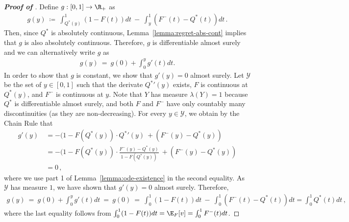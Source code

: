 \begin{proof}[\textbf{Proof of }]
    Define $g: [0, 1] \to \R_+$ as
	\begin{align*}
		g(y)\ \coloneqq\ \int_{Q^*(y)}^1 (1 - F(t)) dt\ -\ \int_y^1 (F^-(t) - Q^*(t)) dt\,.
	\end{align*}
	Then, since $Q^*$ is absolutely continuous, Lemma~\ref{lemma:regret-abs-cont} implies that $g$ is also absolutely continuous. Therefore, $g$ is differentiable almost surely and we can alternatively write $g$ as
	\begin{align*}
		g(y)\ =\ g(0) + \int_0^y g'(t)dt.
	\end{align*}
	In order to show that $g$ is constant, we show that $g'(y) = 0$ almost surely. Let $\mathcal{Y}$ be the set of $y \in [0,1]$ such that the derivate ${Q^*}'(y)$ exists, $F$ is continuous at $Q^*(y)$, and $F^-$ is continuous at $y$. Note that $Y$ has measure $\lambda(Y) = 1$ because $Q^*$ is differentiable almost surely, and both $F$ and $F^{-}$ have only countably many discontinuities (as they are non-decreasing). For every $y \in \mathcal{Y}$, we obtain by the Chain Rule that
	\begin{align*}
		g'(y)\ &= -(1 - F(Q^*(y))\cdot {Q^*}'(y)\ + (F^-(y) - Q^*(y))\\
		&= -(1 - F(Q^*(y))\cdot \frac{F^-(y) - Q^*(y)}{1 - F(Q^*(y))}\ + (F^-(y) - Q^*(y))\\
		&= 0\,,
	\end{align*}
	where we use part 1 of Lemma~\ref{lemma:ode-existence} in the second equality. As $\mathcal{Y}$ has measure $1$, we have shown that $g'(y) = 0$ almost surely. Therefore,
	\begin{align*}
		g(y)\ =\ g(0) + \int_0^y g'(t)dt\ =\ g(0)\ =\ \int_0^1 (1 - F(t)) dt\ -\ \int_0^1 (F^-(t) - Q^*(t)) dt = \int_0^1 Q^*(t) dt\,,
	\end{align*} 
	where the last equality follows from $\int_0^1 (1 - F(t))dt = \E_F[v] = \int_0^1 F^-(t) dt$.
\end{proof}

